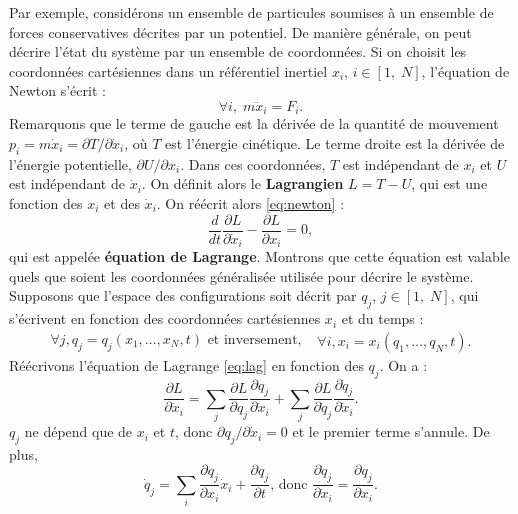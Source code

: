 Par exemple, considérons un ensemble de particules soumises à un ensemble de forces conservatives décrites par un potentiel. De manière générale, on peut décrire l'état du système par un ensemble de coordonnées. Si on choisit les coordonnées cartésiennes dans un référentiel inertiel ${x_i}$, $i\in[1,\;N]$, l'équation de Newton s'écrit :
\begin{equation}
\label{eq:newton}
\forall i,\;m\ddot{x}_i = F_i.
\end{equation}
Remarquons que le terme de gauche est la dérivée de la quantité de mouvement $p_i=m\dot{x}_i=\partial T/\partial\dot{x}_i$, où $T$ est l'énergie cinétique. Le terme droite est la dérivée de l'énergie potentielle, $\partial U/\partial x_i$. Dans ces coordonnées, $T$ est indépendant de $x_i$ et $U$ est indépendant de $\dot{x}_i$. On définit alors le \textbf{Lagrangien} $L=T-U$, qui est une fonction des $x_i$ et des $\dot{x}_i$. On réécrit alors \ref{eq:newton} :
\begin{equation}
\label{eq:lag}
\frac{d}{dt}\frac{\partial L}{\partial \dot{x}_i}-\frac{\partial L}{\partial x_i}=0,
\end{equation}
qui est appelée \textbf{équation de Lagrange}. Montrons que cette équation est valable quels que soient les coordonnées généralisée utilisée pour décrire le système. Supposons que l'espace des configurations soit décrit par ${q_j}$, $j\in[1,\;N]$, qui s'écrivent en fonction des coordonnées cartésiennes ${x_i}$ et du temps :
\begin{equation*}
\begin{split}
\forall j, q_j=q_j(x_1,\ldots,x_N,t)\text{ et inversement, }
\end{split}
\begin{split}
\forall i, x_i=x_i(q_1,\ldots,q_N,t).
\end{split}
\end{equation*}
Réécrivons l'équation de Lagrange \ref{eq:lag} en fonction des ${q_j}$. On a : 
\begin{equation}
\label{eq:lag1}
\frac{\partial L}{\partial \dot{x}_i} = \sum_j \frac{\partial L}{\partial q_j} \frac{\partial q_j}{\partial \dot{x}_i}+ \sum_j\frac{\partial L}{\partial \dot{q}_j}\frac{\partial \dot{q}_j}{\partial \dot{x}_i}.
\end{equation}
$q_j$ ne dépend que de $x_i$ et $t$, donc ${\partial q_j}/{\partial \dot{x}_i}=0$ et le premier terme s'annule. De plus,
\begin{equation}
\dot{q}_j = \sum_i \frac{\partial q_j}{\partial x_i}\dot{x}_i+\frac{\partial q_j}{\partial t}\text{,  donc  }
\frac{\partial \dot{q}_j}{\partial \dot{x}_i}=\frac{\partial q_j}{\partial x_i}.
\label{eq:lag3}
\end{equation}
